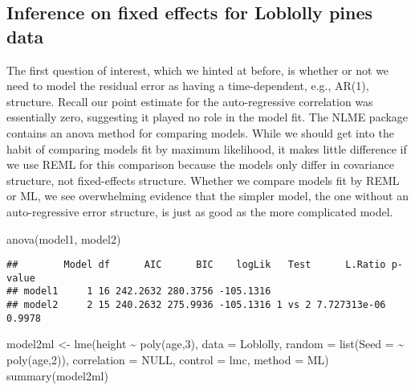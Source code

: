 \documentclass[
]{book}
\newenvironment{Shaded}{\begin{snugshade}}{\end{snugshade}}
\newcommand{\AttributeTok}[1]{\textcolor[rgb]{0.77,0.63,0.00}{#1}}
\newcommand{\ConstantTok}[1]{\textcolor[rgb]{0.00,0.00,0.00}{#1}}
\newcommand{\DecValTok}[1]{\textcolor[rgb]{0.00,0.00,0.81}{#1}}
\newcommand{\FunctionTok}[1]{\textcolor[rgb]{0.00,0.00,0.00}{#1}}
\newcommand{\NormalTok}[1]{#1}
\newcommand{\OtherTok}[1]{\textcolor[rgb]{0.56,0.35,0.01}{#1}}
\newcommand{\SpecialCharTok}[1]{\textcolor[rgb]{0.00,0.00,0.00}{#1}}
\newcommand{\StringTok}[1]{\textcolor[rgb]{0.31,0.60,0.02}{#1}}
\begin{document}
\hypertarget{inference-on-fixed-effects-for-loblolly-pines-data}{%
\subsection{Inference on fixed effects for Loblolly pines data}\label{inference-on-fixed-effects-for-loblolly-pines-data}}

The first question of interest, which we hinted at before, is whether or not we need to model the residual error as having a time-dependent, e.g., AR(1), structure. Recall our point estimate for the auto-regressive correlation was essentially zero, suggesting it played no role in the model fit. The NLME package contains an anova method for comparing models. While we should get into the habit of comparing models fit by maximum likelihood, it makes little difference if we use REML for this comparison because the models only differ in covariance structure, not fixed-effects structure. Whether we compare models fit by REML or ML, we see overwhelming evidence that the simpler model, the one without an auto-regressive error structure, is just as good as the more complicated model.

\begin{Shaded}
\begin{Highlighting}[]
\FunctionTok{anova}\NormalTok{(model1, model2)}
\end{Highlighting}
\end{Shaded}

\begin{verbatim}
##        Model df      AIC      BIC    logLik   Test      L.Ratio p-value
## model1     1 16 242.2632 280.3756 -105.1316                            
## model2     2 15 240.2632 275.9936 -105.1316 1 vs 2 7.727313e-06  0.9978
\end{verbatim}

\begin{Shaded}
\begin{Highlighting}[]
\NormalTok{model2ml }\OtherTok{\textless{}{-}} \FunctionTok{lme}\NormalTok{(height }\SpecialCharTok{\textasciitilde{}} \FunctionTok{poly}\NormalTok{(age,}\DecValTok{3}\NormalTok{), }\AttributeTok{data =}\NormalTok{ Loblolly,}
\AttributeTok{random =} \FunctionTok{list}\NormalTok{(}\AttributeTok{Seed =} \SpecialCharTok{\textasciitilde{}} \FunctionTok{poly}\NormalTok{(age,}\DecValTok{2}\NormalTok{)),}
\AttributeTok{correlation =} \ConstantTok{NULL}\NormalTok{, }\AttributeTok{control =}\NormalTok{ lmc, }\AttributeTok{method =} \StringTok{\textquotesingle{}ML\textquotesingle{}}\NormalTok{)}
\FunctionTok{summary}\NormalTok{(model2ml)}
\end{Highlighting}
\end{Shaded}
\end{document}
